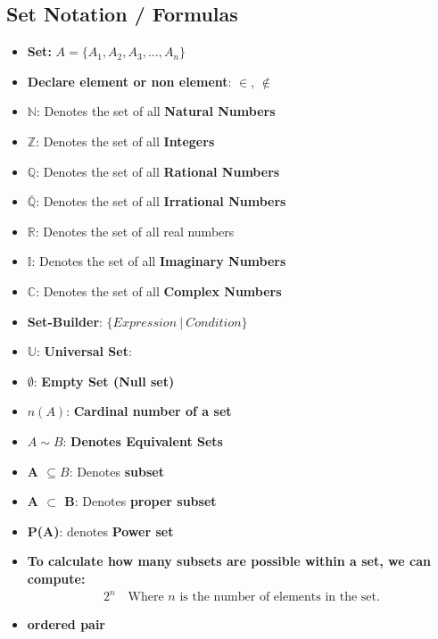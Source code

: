 \documentclass{report}
\begin{document}
      \subsection{Set Notation / Formulas}
      \bigbreak \noindent 
      \begin{itemize}
        \item \textbf{Set:} $A = \{A_{1}, A_{2}, A_{3}, ..., A_{n}\} $  
        \item \textbf{Declare element or non element}: $\in$, $\notin $
        \item \textbf{$\mathbb{N}$}: Denotes the set of all \textbf{Natural Numbers}
        \item $\mathbb{Z}$: Denotes the set of all \textbf{Integers}
        \item $\mathbb{Q}$: Denotes the set of all \textbf{Rational Numbers}
        \item $\mathbb{\bar{Q}}$: Denotes the set of all \textbf{Irrational Numbers}
        \item $\mathbb{R}$: Denotes the set of all real numbers
        \item $\mathbb{I}$: Denotes the set of all \textbf{Imaginary Numbers}
        \item $\mathbb{C}$: Denotes the set of all \textbf{Complex Numbers}
        \item \textbf{Set-Builder}: $\{Expression\ |\ Condition\} $
        \item $\mathbb{U}$: \textbf{Universal Set}: 
        \item $\emptyset$: \textbf{Empty Set (Null set)}
        \item \textbf{$n(A)$}: \textbf{Cardinal number of a set}
        \item \textbf{$A\sim B$}: \textbf{Denotes Equivalent Sets}
        \item \textbf{A $\subseteq B$}: Denotes \textbf{subset}
        \item \textbf{A $\subset$ B}: Denotes \textbf{proper subset}
        \item \textbf{P(A)}: denotes \textbf{Power set}
        \item \textbf{To calculate how many subsets are possible within a set, we can compute:}
        \begin{align*}
            2^{n} \quad 
            \text{Where $n$ is the number of elements in the set}
        .\end{align*}
        \item \textbf{ordered pair}
          \begin{align*}

\end{align*}
\end{itemize}
\end{document}
